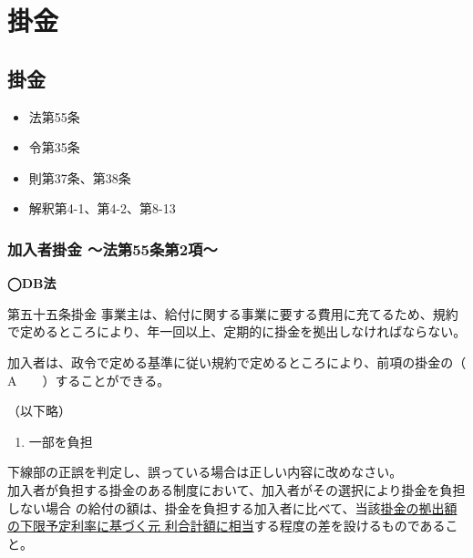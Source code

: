 \section{掛金}

\subsection{掛金}

\begin{InyouJobunbox}
  \begin{itemize}
    \item 法第55条
    \item 令第35条
    \item 則第37条、第38条
    \item 解釈第4-1、第4-2、第8-13
  \end{itemize}
\end{InyouJobunbox}


\subsubsection{加入者掛金 〜法第55条第2項〜}

\begin{fillblank}[年金1 2021 問題1(1)A]
  \noindent \textbf{◯DB法}
  \begin{lawstructure}
    \begin{lawarticle}{第五十五条}{掛金}
      事業主は、給付に関する事業に要する費用に充てるため、規約で定めるところにより、年一回以上、定期的に掛金を拠出しなければならない。

      加入者は、政令で定める基準に従い規約で定めるところにより、前項の掛金の（　　A　　）することができる。

      （以下略）
    \end{lawarticle}
  \end{lawstructure}
\end{fillblank}

\begin{answerbox}
  \begin{enumerate}[A: ]
    \item 一部を負担
  \end{enumerate}
\end{answerbox}


\begin{truefalse}[年金1 2020 問題1(3)\textcircled{2}]
下線部の正誤を判定し、誤っている場合は正しい内容に改めなさい。
\\

  加入者が負担する掛金のある制度において、加入者がその選択により掛金を負担しない場合
の給付の額は、掛金を負担する加入者に比べて、当該\underline{掛金の拠出額の下限予定利率に基づく元
利合計額に相当}する程度の差を設けるものであること。
\end{truefalse}

